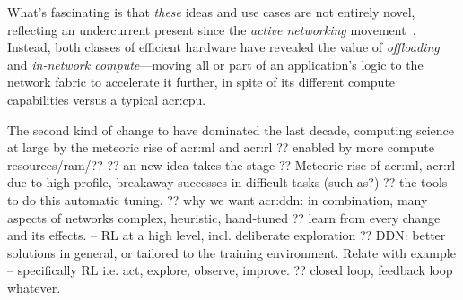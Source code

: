 What's fascinating is that \emph{these} ideas and use cases are not entirely novel, reflecting an undercurrent present since the \emph{active networking} movement~\parencite{DBLP:journals/ccr/TennenhouseW96}.
Instead, both classes of efficient hardware have revealed the value of \emph{offloading} and \emph{in-network compute}---moving all or part of an application's logic to the network fabric to accelerate it further, in spite of its different compute capabilities versus a typical \gls{acr:cpu}.




The second kind of change to have dominated the last decade, computing science at large by the meteoric rise of \gls{acr:ml} and \gls{acr:rl} ?? enabled by more compute resources/ram/??
?? an new idea takes the stage
?? Meteoric rise of \gls{acr:ml}, \gls{acr:rl} due to high-profile, breakaway successes in difficult tasks (such as?)
?? the tools to do this automatic tuning.
?? why we want \gls{acr:ddn}: in combination, many aspects of networks complex, heuristic, hand-tuned
?? learn from every change and its effects. -- RL at a high level, incl. deliberate exploration
?? DDN: better solutions in general, or tailored to the training environment. Relate with example -- specifically RL i.e. act, explore, observe, improve.
?? closed loop, feedback loop whatever.



